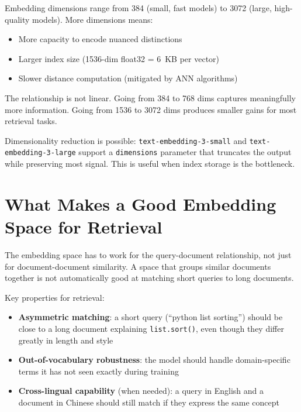 Embedding dimensions range from 384 (small, fast models) to 3072 (large, high-quality models).
More dimensions means:

\begin{itemize}
    \item More capacity to encode nuanced distinctions
    \item Larger index size (1536-dim float32 = 6~KB per vector)
    \item Slower distance computation (mitigated by ANN algorithms)
\end{itemize}

The relationship is not linear. Going from 384 to 768 dims captures meaningfully more
information. Going from 1536 to 3072 dims produces smaller gains for most retrieval tasks.

Dimensionality reduction is possible: \texttt{text-embedding-3-small} and
\texttt{text-embedding-3-large} support a \texttt{dimensions} parameter that truncates the
output while preserving most signal. This is useful when index storage is the bottleneck.

\section{What Makes a Good Embedding Space for Retrieval}

The embedding space has to work for the query-document relationship, not just for
document-document similarity. A space that groups similar documents together is not
automatically good at matching short queries to long documents.

Key properties for retrieval:

\begin{itemize}
    \item \textbf{Asymmetric matching}: a short query (``python list sorting'') should be close
          to a long document explaining \texttt{list.sort()}, even though they differ greatly in
          length and style
    \item \textbf{Out-of-vocabulary robustness}: the model should handle domain-specific terms
          it has not seen exactly during training
    \item \textbf{Cross-lingual capability} (when needed): a query in English and a document in
          Chinese should still match if they express the same concept
\end{itemize}

